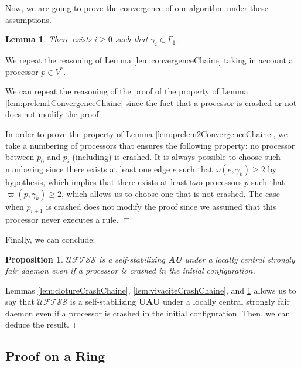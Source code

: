 \documentclass[11pt,english,letterpaper]{article}
\newtheorem{lemma}{Lemma}
\newtheorem{proposition}{Proposition}
\newenvironment{proof}{{\noindent\bf Proof. } }{{\hfill $\Box$}}
\begin{document}
Now, we are going to prove the convergence of our algorithm under these assumptions.

\begin{lemma}\label{lem:convergenceCrashChaine}
There exists $i\geq 0$ such that $\gamma_{i}\in\Gamma_{1}$.
\end{lemma}

\begin{proof}
We repeat the reasoning of Lemma \ref{lem:convergenceChaine} taking in account a processor $p\in V^{*}$.

We can repeat the reasoning of the proof of the property of Lemma \ref{lem:prelem1ConvergenceChaine} since the fact that a processor is crashed or not does not modify the proof.

In order to prove the property of Lemma \ref{lem:prelem2ConvergenceChaine}, we take a numbering of processors that ensures the following property: no processor between $p_{0}$ and $p_{i}$ (including) is crashed. It is always possible to choose such numbering since there exists at least one edge $e$ such that $\omega(e,\gamma_{k})\geq 2$ by hypothesis, which implies that there exists at least two processors $p$ such that $\varpi(p,\gamma_{k})\geq 2$, which allows us to choose one that is not crashed. The case when $p_{i+1}$ is crashed does not modify the proof since we assumed that this processor never executes a rule.
\end{proof}

Finally, we can conclude:

\begin{proposition}\label{prop:SSCrashChaine}
$\mathcal{UFTSS}$ is a self-stabilizing \textbf{AU} under a locally central strongly fair daemon even if a processor is crashed in the initial configuration.
\end{proposition}

\begin{proof}
Lemmas \ref{lem:clotureCrashChaine}, \ref{lem:vivaciteCrashChaine}, and \ref{lem:convergenceCrashChaine} allows us to say that $\mathcal{UFTSS}$ is a self-stabilizing \textbf{UAU} under a locally central strongly fair daemon even if a processor is crashed in the initial configuration. Then, we can deduce the result.
\end{proof}
			
\subsection{Proof on a Ring}
  
\end{document}
